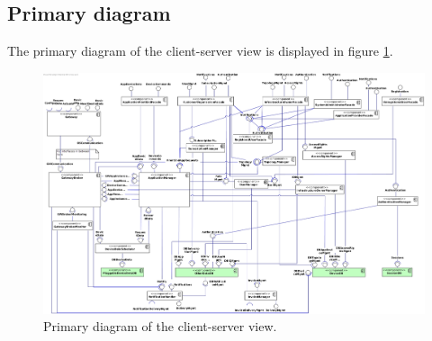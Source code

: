 \begin{landscape}
    \section{Primary diagram}
    The primary diagram of the client-server view is displayed in figure \ref{fig:cc-primary}. \\

    \centering
    \vspace*{\fill}

    \begin{figure}[!htp]
        \centering
        \includegraphics[width=\linewidth]{images/component-PRIMARY}
        \caption{Primary diagram of the client-server view.}\label{fig:cc-primary}
    \end{figure}

    \vfill
\end{landscape}
